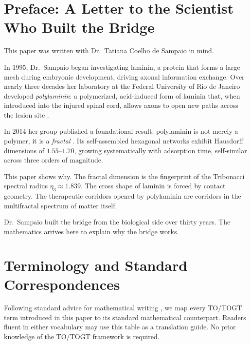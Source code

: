 \documentclass[12pt,a4paper]{article}
\newcommand{\etatrib}{\eta_3}
\begin{document}
\newpage
\tableofcontents
\newpage


\section*{Preface: A Letter to the Scientist Who Built the Bridge}

This paper was written with Dr.\ Tatiana Coelho de Sampaio in mind.

In 1995, Dr.\ Sampaio began investigating laminin, a protein that forms a
large mesh during embryonic development, driving axonal information exchange.
Over nearly three decades her laboratory at the Federal University of
Rio de Janeiro developed \emph{polylaminin}: a polymerized, acid-induced
form of laminin that, when introduced into the injured spinal cord, allows
axons to open new paths across the lesion site \cite{sampaio2025}.

In 2014 her group published a foundational result: polylaminin is not merely
a polymer, it is a \emph{fractal} \cite{hochman2014}. Its self-assembled
hexagonal networks exhibit Hausdorff dimensions of $1.55$--$1.70$, growing
systematically with adsorption time, self-similar across three orders of
magnitude.

This paper shows why. The fractal dimension is the fingerprint of the
Tribonacci spectral radius $\etatrib\approx 1.839$. The cross shape of
laminin is forced by contact geometry. The therapeutic corridors opened by
polylaminin are corridors in the multifractal spectrum of matter itself.

Dr.\ Sampaio built the bridge from the biological side over thirty years.
The mathematics arrives here to explain why the bridge works.


\section{Terminology and Standard Correspondences}
\label{sec:glossary}

Following standard advice for mathematical writing \cite{cohn_advice}, we
map every TO/TOGT term introduced in this paper to its standard mathematical
counterpart. Readers fluent in either vocabulary may use this table as a
translation guide. No prior knowledge of the TO/TOGT framework is required.
\end{document}
